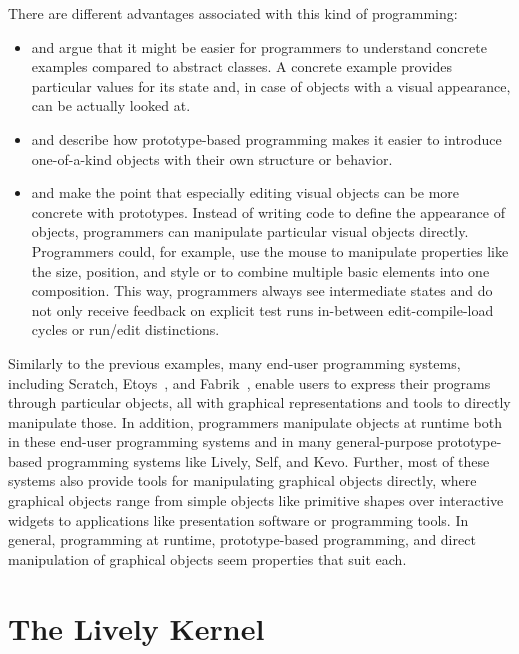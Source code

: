 There are different advantages associated with this kind of programming:
\begin{itemize}
    \item \cite{Taivalsaari1996CVP} and \cite{Ungar1987SPS} argue that it might be easier for programmers to understand concrete examples compared to abstract classes. A concrete example provides particular values for its state and, in case of objects with a visual appearance, can be actually looked at.
    \item \cite{Ungar1987SPS} and \cite{Borning1986CVP} describe how prototype-based programming makes it easier to introduce one-of-a-kind objects with their own structure or behavior.
    \item \cite{Borning1986CVP} and \cite{Maloney1995Mor} make the point that especially editing visual objects can be more concrete with prototypes. Instead of writing code to define the appearance of objects, programmers can manipulate particular visual objects directly. Programmers could, for example, use the mouse to manipulate properties like the size, position, and style or to combine multiple basic elements into one composition. This way, programmers always see intermediate states and do not only receive feedback on explicit test runs in-between edit-compile-load cycles or run/edit distinctions. 
\end{itemize}

Similarly to the previous examples, many end-user programming systems, including Scratch\cite{Maloney2010SPL}, Etoys~\cite{Kay2005Etoys}, and Fabrik~\cite{Ingalls1988FVP}, enable users to express their programs through particular objects, all with graphical representations and tools to directly manipulate those.
In addition, programmers manipulate objects at runtime both in these end-user programming systems and in many general-purpose prototype-based programming systems like Lively, Self, and Kevo.
Further, most of these systems also provide tools for manipulating graphical objects directly, where graphical objects range from simple objects like primitive shapes over interactive widgets to applications like presentation software or programming tools.
In general, programming at runtime, prototype-based programming, and direct manipulation of graphical objects seem properties that suit each.


\section{The Lively Kernel}

